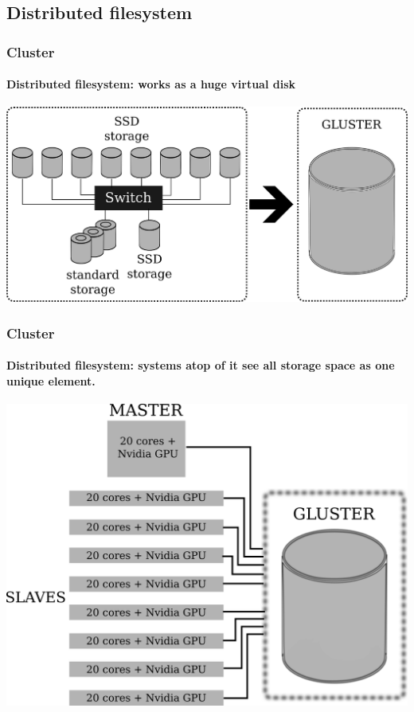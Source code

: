 \documentclass[svgnames,smaller,table]{beamer}
\begin{document}
\subsection{Distributed filesystem}

\begin{frame}
  \frametitle{Cluster}
  \framesubtitle{Distributed filesystem: works as a \textbf{huge} virtual disk}
    \begin{center}
      \includegraphics[scale=0.65]{images/gluster.png}
    \end{center}
\end{frame}

\begin{frame}
  \frametitle{Cluster}
  \framesubtitle{Distributed filesystem: systems atop of it see all storage space as one unique element.}
    \begin{center}
      \includegraphics[scale=0.45]{images/cluster-gluster.png}
        \end{center}
\end{frame}
\end{document}

